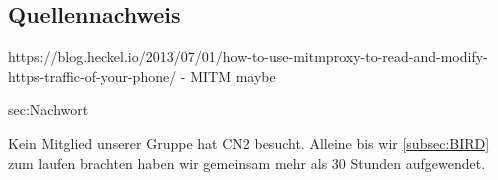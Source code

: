 \documentclass[11pt,titlepage]{article}
\begin{document}
\subsection{Quellennachweis}
\label{subsec:Quellennachweis}

\begingroup
\renewcommand{\section}[2]{}%


\endgroup  

https://blog.heckel.io/2013/07/01/how-to-use-mitmproxy-to-read-and-modify-https-traffic-of-your-phone/ - MITM maybe

\section{Nachwort}
\label{sec:Nachwort}

Kein Mitglied unserer Gruppe hat CN2 besucht. Alleine bis wir \ref{subsec:BIRD} zum laufen brachten haben wir gemeinsam mehr als 30 Stunden aufgewendet. 
\end{document}
